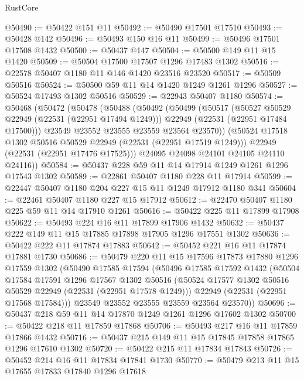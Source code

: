 \begin{lexlean}{RustCore}
\begin{coremodule}
@50490 := @50422 @151 @11
@50492 := @50490 @17501 @17510
@50493 := @50428 @142
@50496 := @50493 @150 @16 @11
@50499 := @50496 @17501 @17508 @1432
@50500 := @50437 @147
@50504 := @50500 @149 @11 @15 @1420
@50509 := @50504 @17500 @17507 @1296 @17483 @1302
@50516 := @22578 @50407 @1180 @11 @146 @1420 @23516 @23520
@50517 := @50509 @50516
@50524 := @50500 @59 @11 @14 @1420 @1249 @1261 @1296
@50527 := @50524 @17493 @1302 @50516
@50529 := @22943 @50407 @1180
@50574 := @50468
    (@50472
      (@50478
        (@50488
          (@50492
            (@50499
              (@50517
                (@50527 @50529 @22949 (@22531 (@22951 @17494 @1249)))
                @22949
                (@22531 (@22951 @17484 @17500)))
              @23549
              @23552
              @23555
              @23559
              @23564
              @23570))
          (@50524 @17518 @1302 @50516 @50529 @22949 (@22531 (@22951 @17519 @1249)))
          @22949
          (@22531 (@22951 @17476 @17525)))
        @24095
        @24098
        @24101
        @24105
        @24110
        @24116))
@50584 := @50437 @228 @59 @11 @14 @17914 @1249 @1261 @1296 @17543 @1302
@50589 := @22861 @50407 @1180 @228 @11 @17914
@50599 := @22447 @50407 @1180 @204 @227 @15 @11 @1249 @17912 @1180 @341
@50604 := @22461 @50407 @1180 @227 @15 @17912
@50612 := @22470 @50407 @1180 @225 @59 @11 @14 @17910 @1261
@50616 := @50422 @225 @11 @17899 @17908
@50622 := @50493 @224 @16 @11 @17899 @17906 @1432
@50632 := @50437 @222 @149 @11 @15 @17885 @17898 @17905 @1296 @17551 @1302
@50636 := @50422 @222 @11 @17874 @17883
@50642 := @50452 @221 @16 @11 @17874 @17881 @1730
@50686 := @50479
    @220
    @11
    @15
    @17596
    @17873
    @17880
    @1296
    @17559
    @1302
    (@50490
      @17585
      @17594
      (@50496
        @17585
        @17592
        @1432
        (@50504
          @17584
          @17591
          @1296
          @17567
          @1302
          @50516
          (@50524 @17577 @1302 @50516 @50529 @22949 (@22531 (@22951 @17578 @1249)))
          @22949
          (@22531 (@22951 @17568 @17584)))
        @23549
        @23552
        @23555
        @23559
        @23564
        @23570))
@50696 := @50437 @218 @59 @11 @14 @17870 @1249 @1261 @1296 @17602 @1302
@50700 := @50422 @218 @11 @17859 @17868
@50706 := @50493 @217 @16 @11 @17859 @17866 @1432
@50716 := @50437 @215 @149 @11 @15 @17845 @17858 @17865 @1296 @17610 @1302
@50720 := @50422 @215 @11 @17834 @17843
@50726 := @50452 @214 @16 @11 @17834 @17841 @1730
@50770 := @50479
    @213
    @11
    @15
    @17655
    @17833
    @17840
    @1296
    @17618

\end{coremodule}
\end{lexlean}
